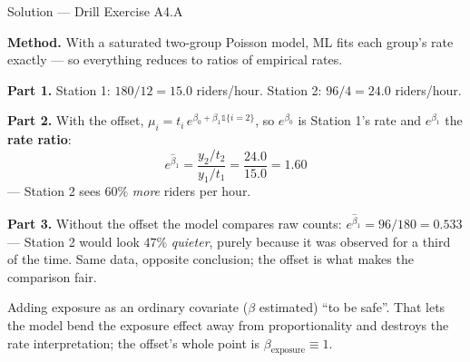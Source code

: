 \documentclass[aspectratio=169,11pt]{beamer}
\begin{document}
\begin{frame}{Solution --- Drill Exercise A4.A}
\begin{solutionbox}
  \textbf{Method.} With a saturated two-group Poisson model, ML fits each group's rate
  exactly --- so everything reduces to ratios of empirical rates.

  \textbf{Part 1.} Station 1: $180/12 = \mathbf{15.0}$ riders/hour.
  Station 2: $96/4 = \mathbf{24.0}$ riders/hour.

  \textbf{Part 2.} With the offset, $\mu_i = t_i\, e^{\beta_0 + \beta_1\mathbb{1}\{i=2\}}$,
  so $e^{\beta_0}$ is Station 1's rate and $e^{\beta_1}$ the \textbf{rate ratio}:
  \[
    e^{\hat\beta_1} = \frac{y_2/t_2}{y_1/t_1} = \frac{24.0}{15.0} = \mathbf{1.60}
  \]
  --- Station 2 sees $60\%$ \emph{more} riders per hour.

  \textbf{Part 3.} Without the offset the model compares raw counts:
  $e^{\hat\beta_1} = 96/180 = \mathbf{0.533}$ --- Station 2 would look $47\%$
  \emph{quieter}, purely because it was observed for a third of the time. Same data,
  opposite conclusion; the offset is what makes the comparison fair.
\end{solutionbox}
\begin{mistake}
  Adding exposure as an ordinary covariate ($\beta$ estimated) ``to be safe''. That
  lets the model bend the exposure effect away from proportionality and destroys the
  rate interpretation; the offset's whole point is $\beta_{\text{exposure}} \equiv 1$.
\end{mistake}
\end{frame}
\end{document}
